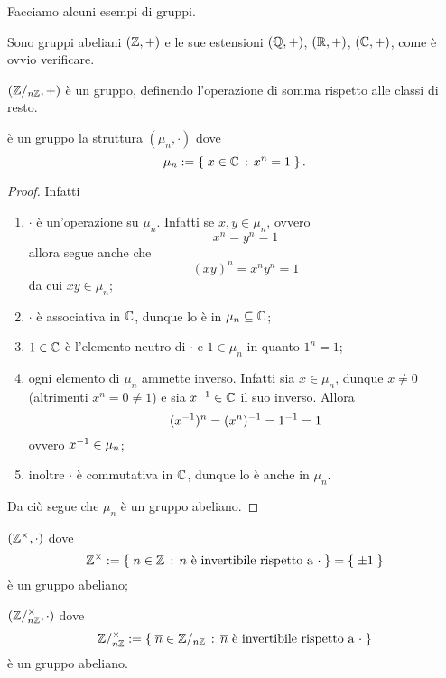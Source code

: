 Facciamo alcuni esempi di gruppi.
\begin{example}
    Sono gruppi abeliani $(\mathbb{Z}, +)$ e le sue estensioni $(\mathbb{Q}, +)$, $(\mathbb{R}, +)$, $(\mathbb{C}, +)$, come è ovvio verificare.
\end{example}
\begin{example}
    $(\mathbb{Z}/_{n\mathbb{Z}}, +)$ è un gruppo, definendo l'operazione di somma rispetto alle classi di resto.
\end{example}
\begin{example}
    è un gruppo la struttura $(\mu_n, \cdot)$ dove \[
        \mu_n := \left\{\;x \in \mathbb{C} \,:\, x^n = 1\;\right\}.    
    \]
\end{example}
\begin{proof}
    Infatti \begin{enumerate}[label={(G\arabic*)}, start=0]
        \item $\cdot$ è un'operazione su $\mu_n$. Infatti se $x, y \in \mu_n$, ovvero \[
            x^n = y^n = 1    
        \] allora segue anche che \[
            (xy)^n = x^ny^n = 1    
        \] da cui $xy \in \mu_n$;
        \item $\cdot$ è associativa in $\mathbb{C}$, dunque lo è in $\mu_n \subseteq \mathbb{C}$;
        \item $1 \in \mathbb{C}$ è l'elemento neutro di $\cdot$ e $1 \in \mu_n$ in quanto $1^n = 1$;
        \item ogni elemento di $\mu_n$ ammette inverso. Infatti sia $x \in \mu_n$, dunque $x \neq 0$ (altrimenti $x^n = 0 \neq 1$) e sia $x^{-1} \in \mathbb{C}$ il suo inverso. Allora \[
            (x^{-1})^n = (x^n)^{-1} = 1^{-1} = 1    
        \] ovvero $x^{-1} \in \mu_n$;
        \item inoltre $\cdot$ è commutativa in $\mathbb{C}$, dunque lo è anche in $\mu_n$.
    \end{enumerate}
    Da ciò segue che $\mu_n$ è un gruppo abeliano.
\end{proof}
\begin{example}
    $(\mathbb{Z}^{\times}, \cdot)$ dove \[
        \mathbb{Z}^{\times} := \left\{\;n \in \mathbb{Z} \,:\, n \text{ è invertibile rispetto a } \cdot\;\right\} = \left\{\;\pm 1\;\right\}
    \] è un gruppo abeliano;
\end{example}
\begin{example}
    $(\mathbb{Z}/_{n\mathbb{Z}}^{\times}, \cdot)$ dove \[
        \invertible{\Zmod{n}} \deq \set{\eqclass n \in \Zmod{n} \suchthat \eqclass n \text{ è invertibile rispetto a } \cdot}
    \] è un gruppo abeliano.
\end{example}
